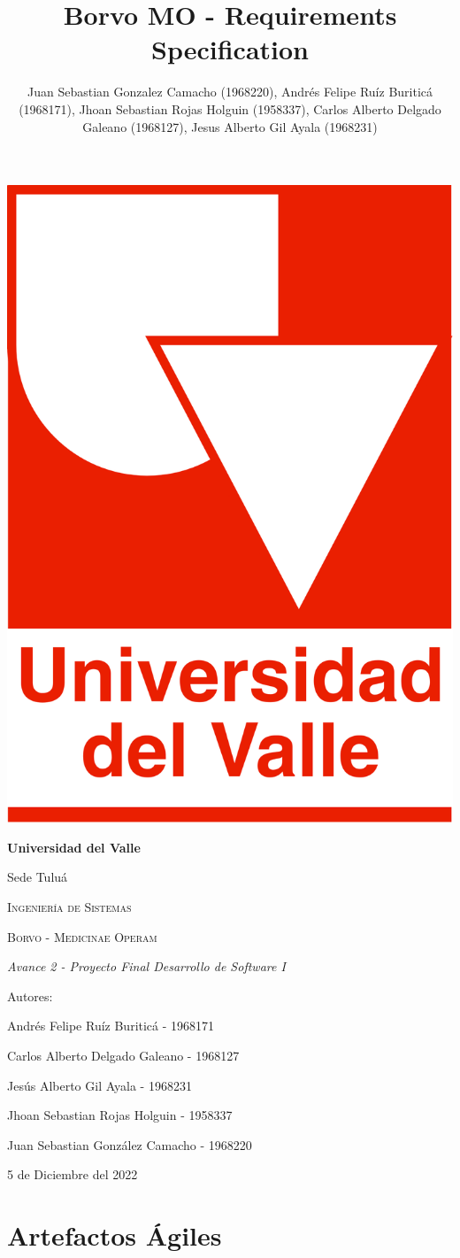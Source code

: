 \documentclass[12pt,a4paper]{article}
\author{Juan Sebastian Gonzalez Camacho (1968220), Andrés Felipe Ruíz Buriticá (1968171), Jhoan Sebastian Rojas Holguin (1958337), Carlos Alberto Delgado Galeano (1968127), Jesus Alberto Gil Ayala (1968231)}
\title{Borvo MO - Requirements Specification}
\begin{document}
\begin{titlepage}
\centering
{\includegraphics[width=0.18 \textwidth]{logo.png} \par}
\vfill
{\bfseries\LARGE Universidad del Valle\par}
{\Large Sede Tuluá\par}
\vfill
{\scshape\Large Ingeniería de Sistemas \par}
\vfill
{\scshape\Huge Borvo - Medicinae Operam \par}
\vfill
{\itshape\Large Avance 2 - Proyecto Final Desarrollo de Software I \par}
\vfill
{\Large Autores: \par}
{\Large Andrés Felipe Ruíz Buriticá - 1968171 \par}
{\Large Carlos Alberto Delgado Galeano - 1968127 \par}
{\Large Jesús Alberto Gil Ayala - 1968231 \par}
{\Large Jhoan Sebastian Rojas Holguin - 1958337 \par}
{\Large Juan Sebastian González Camacho - 1968220 \par}
\vfill
{\Large 5 de Diciembre del 2022 \par}
\end{titlepage}
\tableofcontents
\newpage
\section{Artefactos Ágiles}
\end{document}
